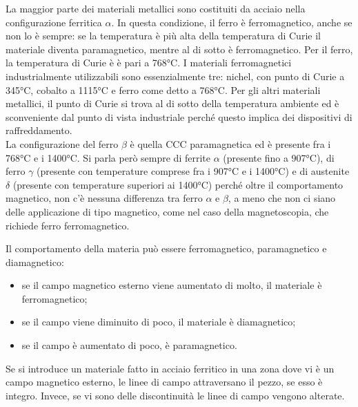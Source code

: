La maggior parte dei materiali metallici sono costituiti da acciaio nella configurazione ferritica $\alpha$. In questa condizione, il ferro è ferromagnetico, anche se non lo è sempre: se la temperatura è più alta della temperatura di Curie il materiale diventa paramagnetico, mentre al di sotto è ferromagnetico. Per il ferro, la temperatura di Curie è è pari a 768°C. I materiali ferromagnetici industrialmente utilizzabili sono essenzialmente tre: nichel, con punto di Curie a 345°C, cobalto a 1115°C e ferro come detto a 768°C. Per gli altri materiali metallici, il punto di Curie si trova al di sotto della temperatura ambiente ed è sconveniente dal punto di vista industriale perché questo implica dei dispositivi di raffreddamento.\\
La configurazione del ferro $\beta$ è quella CCC paramagnetica ed è presente fra i 768°C e i 1400°C. Si parla però sempre di ferrite $\alpha$ (presente fino a 907°C), di ferro $\gamma$ (presente con temperature comprese fra i 907°C e i 1400°C) e di austenite $\delta$ (presente con temperature superiori ai 1400°C) perché oltre il comportamento magnetico, non c’è nessuna differenza tra ferro $\alpha$ e $\beta$, a meno che non ci siano delle applicazione di tipo magnetico, come nel caso della magnetoscopia, che richiede ferro ferromagnetico.

Il comportamento della materia può essere ferromagnetico, paramagnetico e diamagnetico:
\begin{itemize}
    \item se il campo magnetico esterno viene aumentato di molto, il materiale è ferromagnetico;
    \item se il campo viene diminuito di poco, il materiale è diamagnetico;
    \item se il campo è aumentato di poco, è paramagnetico.
\end{itemize}

Se si introduce un materiale fatto in acciaio ferritico in una zona dove vi è un campo magnetico esterno, le linee di campo attraversano il pezzo, se esso è integro. Invece, se vi sono delle discontinuità le linee di campo vengono alterate.

